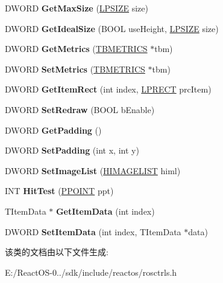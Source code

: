 \begin{DoxyCompactItemize}
D\+W\+O\+RD {\bfseries Get\+Max\+Size} (\hyperlink{structtag_s_i_z_e}{L\+P\+S\+I\+ZE} size)
\item 
\mbox{\label{class_c_toolbar_ae8f897124b50bca4712df8a4d10c7252}} 
D\+W\+O\+RD {\bfseries Get\+Ideal\+Size} (B\+O\+OL use\+Height, \hyperlink{structtag_s_i_z_e}{L\+P\+S\+I\+ZE} size)
\item 
\mbox{\label{class_c_toolbar_adb3de8d7af2d1244cecf7647e8531064}} 
D\+W\+O\+RD {\bfseries Get\+Metrics} (\hyperlink{struct_t_b_m_e_t_r_i_c_s}{T\+B\+M\+E\+T\+R\+I\+CS} $\ast$tbm)
\item 
\mbox{\label{class_c_toolbar_a9ad989934e1c788d83ce315951b87150}} 
D\+W\+O\+RD {\bfseries Set\+Metrics} (\hyperlink{struct_t_b_m_e_t_r_i_c_s}{T\+B\+M\+E\+T\+R\+I\+CS} $\ast$tbm)
\item 
\mbox{\label{class_c_toolbar_a79884840197d77613429267731497b5f}} 
D\+W\+O\+RD {\bfseries Get\+Item\+Rect} (int index, \hyperlink{structtag_r_e_c_t}{L\+P\+R\+E\+CT} prc\+Item)
\item 
\mbox{\label{class_c_toolbar_a6a477ad7b2346940d2cbbbf71212d398}} 
D\+W\+O\+RD {\bfseries Set\+Redraw} (B\+O\+OL b\+Enable)
\item 
\mbox{\label{class_c_toolbar_af86054148307b5f95dd09e93e4284919}} 
D\+W\+O\+RD {\bfseries Get\+Padding} ()
\item 
\mbox{\label{class_c_toolbar_a8ddcec15f68a07e9d29956f8c006d9ea}} 
D\+W\+O\+RD {\bfseries Set\+Padding} (int x, int y)
\item 
\mbox{\label{class_c_toolbar_a9e38a0041d7d3b2174891ed00e045df7}} 
D\+W\+O\+RD {\bfseries Set\+Image\+List} (\hyperlink{struct___i_m_a_g_e_l_i_s_t}{H\+I\+M\+A\+G\+E\+L\+I\+ST} himl)
\item 
\mbox{\label{class_c_toolbar_ad32af10cbbbca8d199cc96532ea8916c}} 
I\+NT {\bfseries Hit\+Test} (\hyperlink{structtag_p_o_i_n_t}{P\+P\+O\+I\+NT} ppt)
\item 
\mbox{\label{class_c_toolbar_a80033805a9a722927c901996ad328fd3}} 
T\+Item\+Data $\ast$ {\bfseries Get\+Item\+Data} (int index)
\item 
\mbox{\label{class_c_toolbar_a951278512b580c645aa5f990ba0c838f}} 
D\+W\+O\+RD {\bfseries Set\+Item\+Data} (int index, T\+Item\+Data $\ast$data)
\end{DoxyCompactItemize}


该类的文档由以下文件生成\+:\begin{DoxyCompactItemize}
\item 
E\+:/\+React\+O\+S-\/0../sdk/include/reactos/rosctrls.\+h\end{DoxyCompactItemize}
